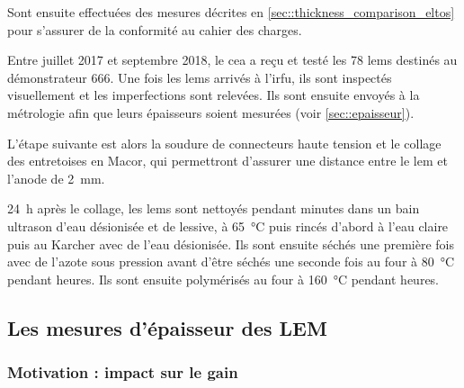             Sont ensuite effectuées des mesures décrites en \autoref{sec::thickness_comparison_eltos} pour s'assurer de la conformité au cahier des charges.
            
            Entre juillet 2017 et septembre 2018, le \gls{cea} a reçu et testé les 78 \glspl{lem} destinés au démonstrateur 666. Une fois les \glspl{lem} arrivés à l'\gls{irfu}, ils sont inspectés visuellement et les imperfections sont relevées. Ils sont ensuite envoyés à la métrologie afin que leurs épaisseurs soient mesurées (voir \autoref{sec::epaisseur}).
            
            L'étape suivante est alors la soudure de connecteurs haute tension et le collage des entretoises en Macor, qui permettront d'assurer une distance entre le \gls{lem} et l'anode de \SI{2}{\milli\meter}.
            
            \SI{24}{\hour} après le collage, les \glspl{lem} sont nettoyés pendant  minutes dans un bain ultrason d'eau désionisée et de lessive, à \SI{65}{\celsius} puis rincés d'abord à l'eau claire puis au Karcher avec de l'eau désionisée. Ils sont ensuite séchés une première fois avec de l'azote sous pression avant d'être séchés une seconde fois au four à \SI{80}{\celsius} pendant  heures. Ils sont ensuite polymérisés au four à \SI{160}{\celsius} pendant  heures.
        
        \subsection{Les mesures d’épaisseur des LEM}\label{sec::epaisseur}
        
            \subsubsection{Motivation : impact sur le gain}
            

